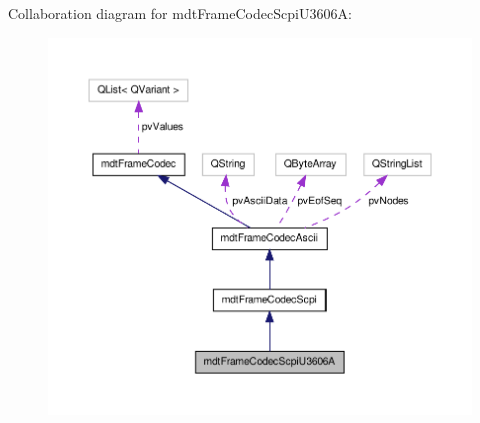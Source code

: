 Collaboration diagram for mdt\-Frame\-Codec\-Scpi\-U3606\-A\-:\nopagebreak
\begin{figure}[H]
\begin{center}
\leavevmode
\includegraphics[width=350pt]{classmdt_frame_codec_scpi_u3606_a__coll__graph}
\end{center}
\end{figure}
